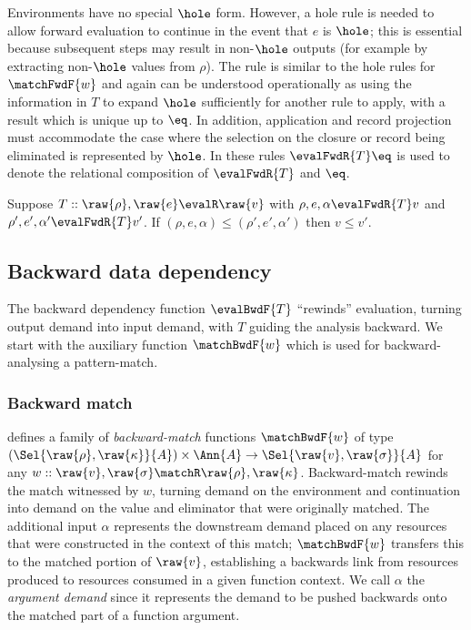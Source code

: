  Environments have no special $\hole$ form. However, a hole rule is needed to allow forward evaluation to continue in the event that $e$ is $\hole$; this is essential because subsequent steps may result in non-$\hole$ outputs (for example by extracting non-$\hole$ values from $\rho$). The rule is similar to the hole rules for $\matchFwdF{w}$ and again can be understood operationally as using the information in $T$ to expand $\hole$ sufficiently for another rule to apply, with a result which is unique up to $\eq$. In addition, application and record projection must accommodate the case where the selection on the closure or record being eliminated is represented by $\hole$. In these rules $\evalFwdR{T}\eq$ is used to denote the relational composition of $\evalFwdR{T}$ and $\eq$.

\begin{lemma}
   Suppose $T :: \raw{\rho}, \raw{e} \evalR \raw{v}$ with $\rho, e, \alpha \evalFwdR{T} v$ and $\rho', e', \alpha' \evalFwdR{T} v'$. If $(\rho, e, \alpha) \leq (\rho', e', \alpha')$ then $v \leq v'$.
\end{lemma}

\subsection{Backward data dependency}
\label{sec:data-dependencies:analyses:bwd}

The backward dependency function $\evalBwdF{T}$ ``rewinds'' evaluation, turning output demand into input demand, with $T$ guiding the analysis backward. We start with the auxiliary function $\matchBwdF{w}$ which is used for backward-analysing a pattern-match.

\subsubsection{Backward match}
\label{sec:data-dependencies:analyses:bwd:pattern-match}

 defines a family of \emph{backward-match} functions $\matchBwdF{w}$ of type $(\Sel{\raw{\rho}, \raw{\kappa}}{A}) \times \Ann{A} \to \Sel{\raw{v}, \raw{\sigma}}{A}$ for any $w :: \raw{v}, \raw{\sigma} \matchR \raw{\rho}, \raw{\kappa}$. Backward-match rewinds the match witnessed by $w$, turning demand on the environment and continuation into demand on the value and eliminator that were originally matched. The additional input $\alpha$ represents the downstream demand placed on any resources that were constructed in the context of this match; $\matchBwdF{w}$ transfers this to the matched portion of $\raw{v}$, establishing a backwards link from resources produced to resources consumed in a given function context. We call $\alpha$ the \emph{argument demand} since it represents the demand to be pushed backwards onto the matched part of a function argument.

